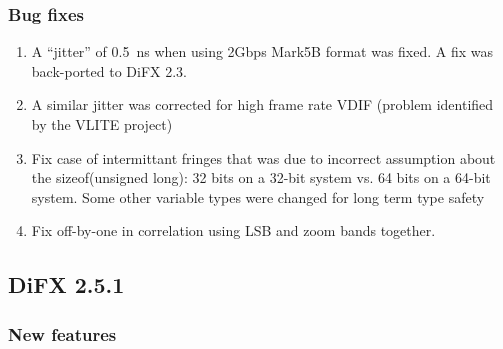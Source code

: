 \subsubsection{Bug fixes}

\begin{enumerate}

\item A ``jitter'' of 0.5~ns when using 2Gbps Mark5B format was fixed.  A fix was back-ported to DiFX 2.3.
\item A similar jitter was corrected for high frame rate VDIF (problem identified by the VLITE project)
\item Fix case of intermittant fringes that was due to incorrect assumption about the sizeof(unsigned long): 32 bits on a 32-bit system vs. 64 bits on a 64-bit system.
Some other variable types were changed for long term type safety
\item Fix off-by-one in correlation using LSB and zoom bands together.

\end{enumerate}

\subsection{DiFX 2.5.1}

\subsubsection{New features}

